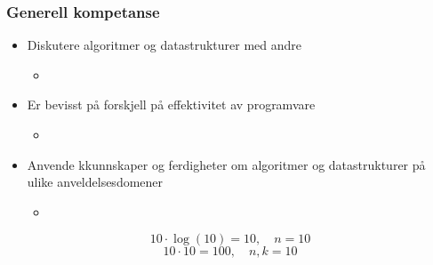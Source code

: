 \documentclass{article}
\begin{document}
    \subsubsection{Generell kompetanse}
    \begin{itemize}
        \item Diskutere algoritmer og datastrukturer med andre
            \begin{itemize}
                \item \color{red}{Gruppetimer, samarbeid på oblig}
            \end{itemize}
        \item Er bevisst på forskjell på effektivitet av programvare
            \begin{itemize}
                \item \color{red}{Dekket første uke}
            \end{itemize}
        \item Anvende kkunnskaper og ferdigheter om algoritmer og datastrukturer på ulike anveldelsesdomener
            \begin{itemize}
                \item \color{red}{Problemløsning, ukesoppgaver}
            \end{itemize}
    \end{itemize}

    \[ 10 \cdot  \log\left( 10 \right) = 10, \quad n = 10 \]
    \[ 10 \cdot 10 = 100, \quad n, k = 10 \]
\end{document}
